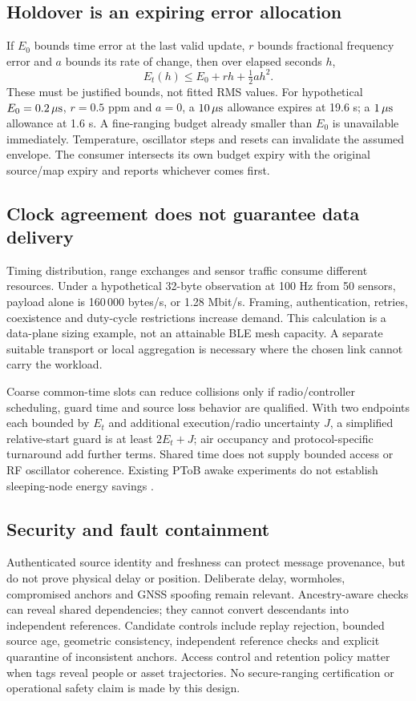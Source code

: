 \documentclass[11pt,letterpaper]{article}
\begin{document}
\subsection{Holdover is an expiring error allocation}
If $E_0$ bounds time error at the last valid update, $r$ bounds fractional frequency error and $a$ bounds its rate of change, then over elapsed seconds $h$,
\begin{equation}
 E_t(h)\leq E_0+rh+\tfrac12 ah^2.\label{eq:hold}
\end{equation}
These must be justified bounds, not fitted RMS values. For hypothetical $E_0=0.2\,\mu\mathrm{s}$, $r=0.5$ ppm and $a=0$, a $10\,\mu\mathrm{s}$ allowance expires at 19.6 s; a $1\,\mu\mathrm{s}$ allowance at 1.6 s. A fine-ranging budget already smaller than $E_0$ is unavailable immediately. Temperature, oscillator steps and resets can invalidate the assumed envelope. The consumer intersects its own budget expiry with the original source/map expiry and reports whichever comes first.

\subsection{Clock agreement does not guarantee data delivery}
Timing distribution, range exchanges and sensor traffic consume different resources. Under a hypothetical 32-byte observation at 100 Hz from 50 sensors, payload alone is 160\,000 bytes/s, or 1.28 Mbit/s. Framing, authentication, retries, coexistence and duty-cycle restrictions increase demand. This calculation is a data-plane sizing example, not an attainable BLE mesh capacity. A separate suitable transport or local aggregation is necessary where the chosen link cannot carry the workload.

Coarse common-time slots can reduce collisions only if radio/controller scheduling, guard time and source loss behavior are qualified. With two endpoints each bounded by $E_t$ and additional execution/radio uncertainty $J$, a simplified relative-start guard is at least $2E_t+J$; air occupancy and protocol-specific turnaround add further terms. Shared time does not supply bounded access or RF oscillator coherence. Existing PToB awake experiments do not establish sleeping-node energy savings \cite{power}.

\subsection{Security and fault containment}
Authenticated source identity and freshness can protect message provenance, but do not prove physical delay or position. Deliberate delay, wormholes, compromised anchors and GNSS spoofing remain relevant. Ancestry-aware checks can reveal shared dependencies; they cannot convert descendants into independent references. Candidate controls include replay rejection, bounded source age, geometric consistency, independent reference checks and explicit quarantine of inconsistent anchors. Access control and retention policy matter when tags reveal people or asset trajectories. No secure-ranging certification or operational safety claim is made by this design.
\end{document}
